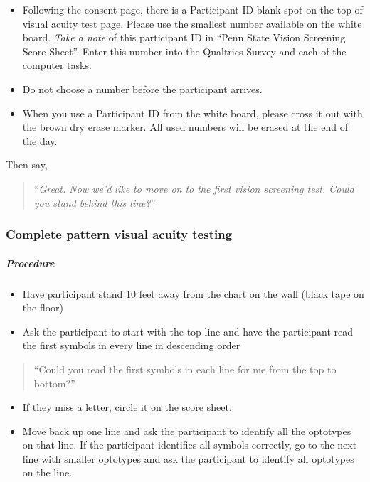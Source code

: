 \documentclass[]{article}
\providecommand{\tightlist}{%
  \setlength{\itemsep}{0pt}\setlength{\parskip}{0pt}}
\let\oldsubparagraph\subparagraph
\renewcommand{\subparagraph}[1]{\oldsubparagraph{#1}\mbox{}}
\begin{document}
\begin{itemize}
\item
  Following the consent page, there is a Participant ID blank spot on
  the top of visual acuity test page. Please use the smallest number
  available on the white board. \emph{Take a note} of this participant
  ID in ``Penn State Vision Screening Score Sheet''. Enter this number
  into the Qualtrics Survey and each of the computer tasks.
\item
  Do not choose a number before the participant arrives.
\item
  When you use a Participant ID from the white board, please cross it
  out with the brown dry erase marker. All used numbers will be erased
  at the end of the day.
\end{itemize}

Then say,

\begin{quote}
``\emph{Great. Now we'd like to move on to the first vision screening
test. Could you stand behind this line?}''
\end{quote}

\subsubsection{Complete pattern visual acuity
testing}\label{complete-pattern-visual-acuity-testing}

\subparagraph{Procedure}\label{procedure}

\begin{itemize}
\tightlist
\item
  Have participant stand 10 feet away from the chart on the wall (black
  tape on the floor)
\item
  Ask the participant to start with the top line and have the
  participant read the first symbols in every line in descending order
\end{itemize}

\begin{quote}
``Could you read the first symbols in each line for me from the top to
bottom?''
\end{quote}

\begin{itemize}
\tightlist
\item
  If they miss a letter, circle it on the score sheet.
\item
  Move back up one line and ask the participant to identify all the
  optotypes on that line. If the participant identifies all symbols
  correctly, go to the next line with smaller optotypes and ask the
  participant to identify all optotypes on the line.
\end{itemize}
\end{document}
